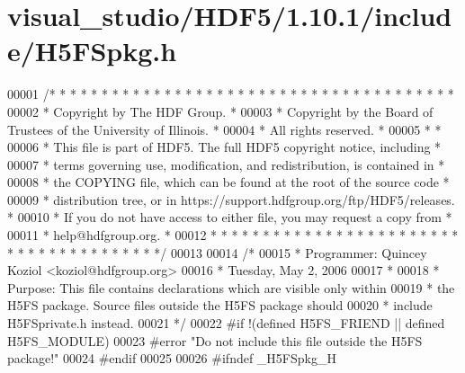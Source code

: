 \hypertarget{visual__studio_2_h_d_f5_21_810_81_2include_2_h5_f_spkg_8h_source}{}\section{visual\+\_\+studio/\+H\+D\+F5/1.10.1/include/\+H5\+F\+Spkg.h}
\label{visual__studio_2_h_d_f5_21_810_81_2include_2_h5_f_spkg_8h_source}

\begin{DoxyCode}
00001 \textcolor{comment}{/* * * * * * * * * * * * * * * * * * * * * * * * * * * * * * * * * * * * * * *}
00002 \textcolor{comment}{ * Copyright by The HDF Group.                                               *}
00003 \textcolor{comment}{ * Copyright by the Board of Trustees of the University of Illinois.         *}
00004 \textcolor{comment}{ * All rights reserved.                                                      *}
00005 \textcolor{comment}{ *                                                                           *}
00006 \textcolor{comment}{ * This file is part of HDF5.  The full HDF5 copyright notice, including     *}
00007 \textcolor{comment}{ * terms governing use, modification, and redistribution, is contained in    *}
00008 \textcolor{comment}{ * the COPYING file, which can be found at the root of the source code       *}
00009 \textcolor{comment}{ * distribution tree, or in https://support.hdfgroup.org/ftp/HDF5/releases.  *}
00010 \textcolor{comment}{ * If you do not have access to either file, you may request a copy from     *}
00011 \textcolor{comment}{ * help@hdfgroup.org.                                                        *}
00012 \textcolor{comment}{ * * * * * * * * * * * * * * * * * * * * * * * * * * * * * * * * * * * * * * */}
00013 
00014 \textcolor{comment}{/*}
00015 \textcolor{comment}{ * Programmer:  Quincey Koziol <koziol@hdfgroup.org>}
00016 \textcolor{comment}{ *              Tuesday, May  2, 2006}
00017 \textcolor{comment}{ *}
00018 \textcolor{comment}{ * Purpose:     This file contains declarations which are visible only within}
00019 \textcolor{comment}{ *              the H5FS package.  Source files outside the H5FS package should}
00020 \textcolor{comment}{ *              include H5FSprivate.h instead.}
00021 \textcolor{comment}{ */}
00022 \textcolor{preprocessor}{#if !(defined H5FS\_FRIEND || defined H5FS\_MODULE)}
00023 \textcolor{preprocessor}{#error "Do not include this file outside the H5FS package!"}
00024 \textcolor{preprocessor}{#endif}
00025 
00026 \textcolor{preprocessor}{#ifndef \_H5FSpkg\_H}

\end{DoxyCode}
